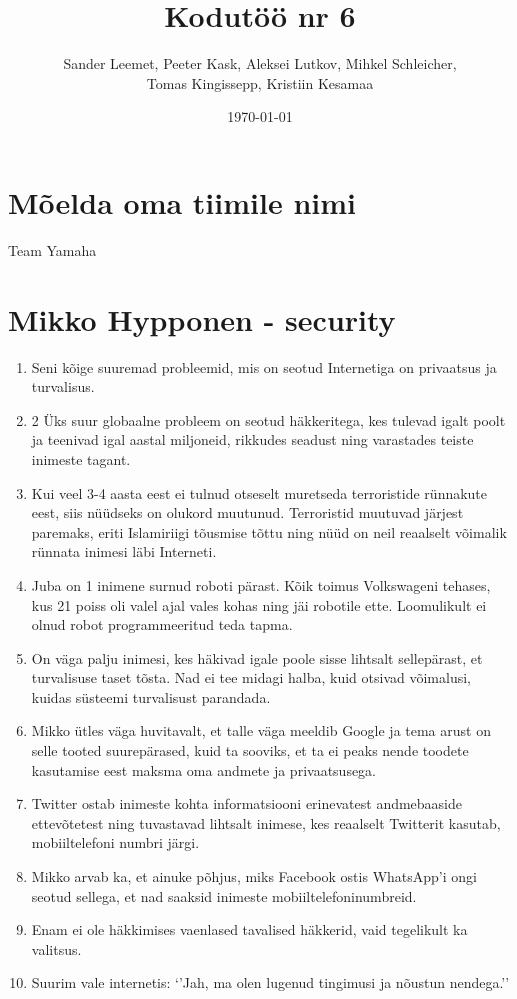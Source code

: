 \documentclass{article}
\title{Kodutöö nr 6}
\author{Sander Leemet, Peeter Kask, Aleksei Lutkov, Mihkel Schleicher,\\ Tomas Kingissepp, Kristiin Kesamaa}
\date{\today}
\begin{document}
\maketitle

\section{Mõelda oma tiimile nimi}
Team Yamaha

\section{Mikko Hypponen - security}
\begin{enumerate}
	\item{Seni kõige suuremad probleemid, mis on seotud Internetiga on privaatsus ja turvalisus.}
	\item{2 Üks suur globaalne probleem on seotud häkkeritega, kes tulevad igalt poolt ja teenivad igal aastal miljoneid, rikkudes seadust ning varastades teiste inimeste tagant.}
	\item{Kui veel 3-4 aasta eest ei tulnud otseselt muretseda terroristide rünnakute eest, siis nüüdseks on olukord muutunud. Terroristid muutuvad järjest paremaks, eriti Islamiriigi tõusmise tõttu ning nüüd on neil reaalselt võimalik rünnata inimesi läbi Interneti.}
	\item{Juba on 1 inimene surnud roboti pärast. Kõik toimus Volkswageni tehases, kus 21 poiss oli valel ajal vales kohas ning jäi robotile ette. Loomulikult ei olnud robot programmeeritud teda tapma.}
	\item{On väga palju inimesi, kes häkivad igale poole sisse lihtsalt sellepärast, et turvalisuse taset tõsta. Nad ei tee midagi halba, kuid otsivad võimalusi, kuidas süsteemi turvalisust parandada.}
	\item{Mikko ütles väga huvitavalt, et talle väga meeldib Google ja tema arust on selle tooted suurepärased, kuid ta sooviks, et ta ei peaks nende toodete kasutamise eest maksma oma andmete ja privaatsusega.}
	\item{Twitter ostab inimeste kohta informatsiooni erinevatest andmebaaside ettevõtetest ning tuvastavad lihtsalt inimese, kes reaalselt Twitterit kasutab, mobiiltelefoni numbri järgi.}
	\item{Mikko arvab ka, et ainuke põhjus, miks Facebook ostis WhatsApp’i ongi seotud sellega, et nad saaksid inimeste mobiiltelefoninumbreid.}
	\item{Enam ei ole häkkimises vaenlased tavalised häkkerid, vaid tegelikult ka valitsus.}
	\item{Suurim vale internetis: ‘’Jah, ma olen lugenud tingimusi ja nõustun nendega.’’}


\end{enumerate}
\end{document}
